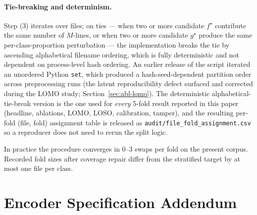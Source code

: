 \documentclass[sensors,article,submit,moreauthors,pdftex]{Definitions/mdpi}
\begin{document}
\paragraph{Tie-breaking and determinism.} Step (3) iterates over files; on ties --- when two or more candidate $f^\star$ contribute the same number of $M$-lines, or when two or more candidate $g^\star$ produce the same per-class-proportion perturbation --- the implementation breaks the tie by ascending alphabetical filename ordering, which is fully deterministic and not dependent on process-level hash ordering. An earlier release of the script iterated an unordered Python \texttt{set}, which produced a hash-seed-dependent partition order across preprocessing runs (the latent reproducibility defect surfaced and corrected during the LOMO study; Section~\ref{sec:abl-lomo}). The deterministic alphabetical-tie-break version is the one used for \emph{every} 5-fold result reported in this paper (headline, ablations, LOMO, LOSO, calibration, tamper), and the resulting per-fold (file, fold) assignment table is released as \texttt{audit/file\_fold\_assignment.csv} so a reproducer does not need to rerun the split logic.

In practice the procedure converges in 0--3 swaps per fold on the present corpus. Recorded fold sizes after coverage repair differ from the stratified target by at most one file per class.


\section{Encoder Specification Addendum}
\label{app:encoder-spec}
\end{document}
